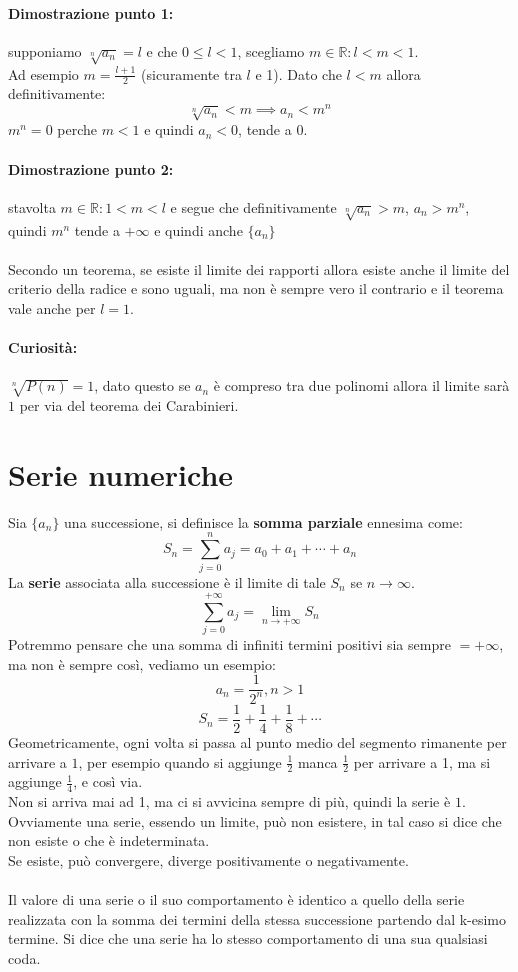 \documentclass[12pt,a4paper]{article}
\let\oldsection\section
\renewcommand{\section}{\clearpage\oldsection}
\begin{document}
\paragraph{Dimostrazione punto 1:} supponiamo $\sqrt[n]{a_n} = l$ e che $0 \leq l < 1$, scegliamo $m \in \mathbb{R} : l < m < 1$.\\
Ad esempio $m = \frac{l + 1}{2}$ (sicuramente tra $l$ e 1).
Dato che $l < m$ allora definitivamente:
\[
\sqrt[n]{a_n} < m \implies a_n < m^n
\]
$m^n = 0$ perche $m < 1$ e quindi $a_n < 0$, tende a 0.
\paragraph{Dimostrazione punto 2:} stavolta $m \in \mathbb{R} : 1 < m < l$ e segue che definitivamente $\sqrt[n]{a_n} > m$, $a_n > m^n$, quindi $m^n$ tende a $+\infty$ e quindi anche $\{a_n\}$\\\\
Secondo un teorema, se esiste il limite dei rapporti allora esiste anche il limite del criterio della radice e sono uguali, ma non è sempre vero il contrario e il teorema vale anche per $l = 1$.
\paragraph{Curiosità:} $\sqrt[n]{P(n)} = 1$, dato questo se $a_n$ è compreso tra due polinomi allora il limite sarà $1$ per via del teorema dei Carabinieri.

\section{Serie numeriche}
Sia $\{a_n\}$ una successione, si definisce la \textbf{somma parziale} ennesima come:
\[
S_n = \sum_{j=0}^{n} a_j = a_0 + a_1 + \cdots + a_n
\]
La \textbf{serie} associata alla successione è il limite di tale $S_n$ se $n \to \infty$.\\
\[
\sum_{j=0}^{+\infty} a_j = \lim_{n \to +\infty} S_n
\]
Potremmo pensare che una somma di infiniti termini positivi sia sempre $= +\infty$, ma non è sempre così, vediamo un esempio:\\
\[
a_n = \frac{1}{2^n}, n > 1
\]
\[
S_n = \frac{1}{2} + \frac{1}{4} + \frac{1}{8} + \cdots
\]
Geometricamente, ogni volta si passa al punto medio del segmento rimanente per arrivare a $1$, per esempio quando si aggiunge $\frac{1}{2}$ manca $\frac{1}{2}$ per arrivare a 1, ma si aggiunge $\frac{1}{4}$, e così via.\\
Non si arriva mai ad 1, ma ci si avvicina sempre di più, quindi la serie è $1$.\\
Ovviamente una serie, essendo un limite, può non esistere, in tal caso si dice che non esiste o che è indeterminata.\\
Se esiste, può convergere, diverge positivamente o negativamente.\\\\
Il valore di una serie o il suo comportamento è identico a quello della serie realizzata con la somma dei termini della stessa successione partendo dal k-esimo termine. Si dice che una serie ha lo stesso comportamento di una sua qualsiasi coda.
\end{document}
